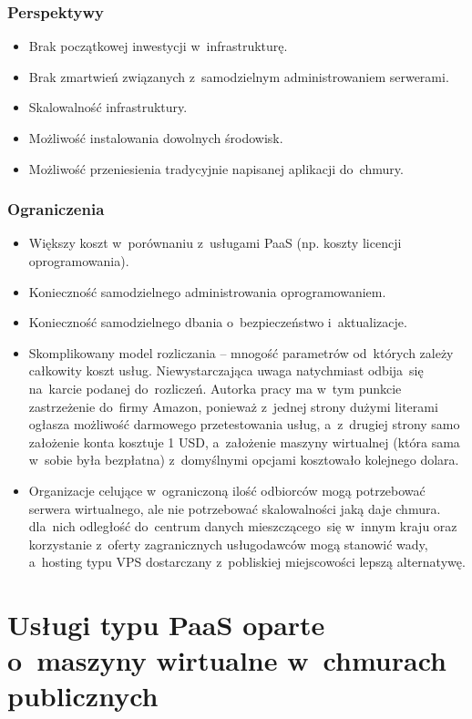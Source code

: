 \documentclass[12pt,a4paper,twoside,titlepage,openright]{book}
\begin{document}
\subsubsection{Perspektywy}
\begin{itemize}
\item Brak początkowej inwestycji w~infrastrukturę.
\item Brak zmartwień związanych z~samodzielnym administrowaniem serwerami.
\item Skalowalność infrastruktury.
\item Możliwość instalowania dowolnych środowisk.
\item Możliwość przeniesienia tradycyjnie napisanej aplikacji do~chmury.
\end{itemize}

\subsubsection{Ograniczenia}
\begin{itemize}
\item Większy koszt w~porównaniu z~usługami PaaS (np. koszty licencji oprogramowania).
\item Konieczność samodzielnego administrowania oprogramowaniem.
\item Konieczność samodzielnego dbania o~bezpieczeństwo i~aktualizacje.
\item Skomplikowany model rozliczania -- mnogość parametrów od~których zależy całkowity koszt usług. Niewystarczająca uwaga natychmiast odbija~się na~karcie podanej do~rozliczeń. Autorka pracy ma w~tym punkcie zastrzeżenie do~firmy Amazon, ponieważ z~jednej strony dużymi literami ogłasza możliwość darmowego przetestowania usług, a~z~drugiej strony samo założenie konta kosztuje 1 USD, a~założenie maszyny wirtualnej (która sama w~sobie była bezpłatna) z~domyślnymi opcjami kosztowało kolejnego dolara. 
\item Organizacje celujące w~ograniczoną ilość odbiorców mogą potrzebować serwera wirtualnego, ale nie potrzebować skalowalności jaką daje chmura. dla~nich odległość do~centrum danych mieszczącego~się w~innym kraju oraz korzystanie z~oferty zagranicznych usługodawców mogą stanowić wady, a~hosting typu VPS dostarczany z~pobliskiej miejscowości lepszą alternatywę.
\end{itemize}

\section{Usługi typu PaaS oparte o~maszyny wirtualne w~chmurach publicznych}\label{section:podejsciePaas}
\end{document}
